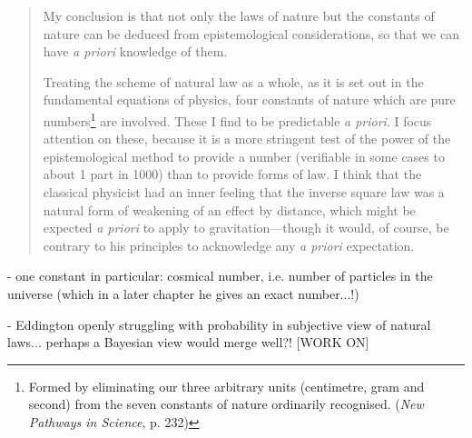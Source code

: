 \begin{quote}
    My conclusion is that not only the laws of nature but the constants of nature can be deduced from epistemological considerations, so that we can have \emph{a priori} knowledge of them.
    
    Treating the scheme of natural law as a whole, as it is set out in the fundamental equations of physics, four constants of nature which are pure numbers\footnote{Formed by eliminating our three arbitrary units (centimetre, gram and second) from the seven constants of nature ordinarily recognised. (\emph{New Pathways in Science}, p. 232)} are involved.  These I find to be predictable \emph{a priori}.  I focus attention on these, because it is a more stringent test of the power of the epistemological method to provide a number (verifiable in some cases to about 1 part in 1000) than to provide forms of law.  I think that the classical physicist had an inner feeling that the inverse square law was a natural form of weakening of an effect by distance, which might be expected \emph{a priori} to apply to gravitation---though it would, of course, be contrary to his principles to acknowledge any \emph{a priori} expectation.  
    
    \citep[p. 58-59]{Eddington1939}
\end{quote}

- one constant in particular: cosmical number, i.e. number of particles in the universe (which in a later chapter he gives an exact number...!)

- Eddington openly struggling with probability in subjective view of natural laws... perhaps a Bayesian view would merge well?!  [WORK ON]

